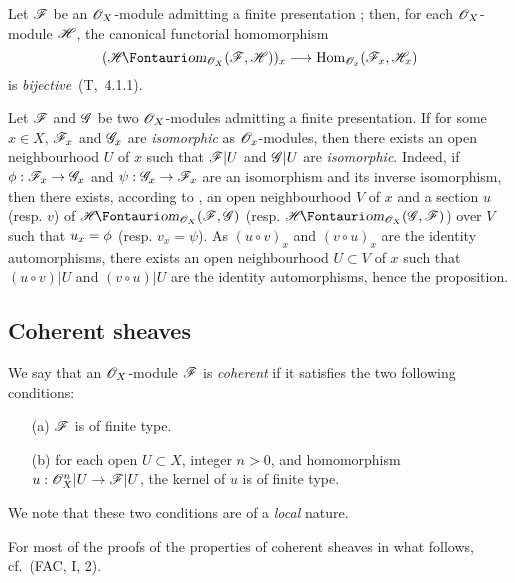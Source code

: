 \begin{env}[5.2.6]
\label{0.5.2.6}
Let $\mathscr{F}$ be an $\mathscr{O}_X$-module admitting a finite presentation ;
then, for each $\mathscr{O}_X$-module $\mathscr{H}$, the canonical functorial homomorphism
\[
  (\shHom_{\sh{O}_X}(\sh{F},\sh{H}))_x\to\Hom_{\sh{O}_x}(\sh{F}_x,\sh{H}_x)
\]
is \emph{bijective}~(T,~4.1.1).
\end{env}

\begin{env}[5.2.7]
\label{0.5.2.7}
Let $\mathscr{F}$ and $\mathscr{G}$ be two $\mathscr{O}_X$-modules admitting a finite presentation.
If for some $x\in X$, $\mathscr{F}_x$ and $\mathscr{G}_x$ are \emph{isomorphic} as $\mathscr{O}_x$-modules, then there exists an open neighbourhood $U$ of $x$ such that $\mathscr{F}|U$ and $\mathscr{G}|U$ are \emph{isomorphic}.
Indeed, if $\vphi:\sh{F}_x\to\sh{G}_x$ and $\psi:\sh{G}_x\to\sh{F}_x$ are an isomorphism and its inverse isomorphism, then there exists, according to , an open neighbourhood $V$ of $x$ and a section $u$ (resp. $v$) of $\shHom_{\sh{O}_X}(\sh{F},\sh{G})$ (resp. $\shHom_{\sh{O}_X}(\sh{G},\sh{F})$) over $V$ such
that $u_x=\phi$ (resp. $v_x=\psi$).
As $(u\circ v)_x$ and $(v\circ u)_x$ are the identity automorphisms, there exists an open neighbourhood $U\subset V$ of $x$ such that $(u\circ v)|U$ and $(v\circ u)|U$ are the identity automorphisms, hence the proposition.
\end{env}

\subsection{Coherent sheaves}
\label{subsection:0.5.3}

\begin{env}[5.3.1]
\label{0.5.3.1}
We say that an $\mathscr{O}_X$-module $\mathscr{F}$ is \emph{coherent} if it satisfies the two following conditions:
\begin{enumerate}
  \item[(a)] $\mathscr{F}$ is of finite type.
  \item[(b)] for each open $U\subset X$, integer $n>0$, and homomorphism $u:\sh{O}_X^n|U\to\sh{F}|U$, the kernel of $u$ is of finite type.
\end{enumerate}
We note that these two conditions are of a \emph{local} nature.

For most of the proofs of the properties of coherent sheaves in what follows, cf.~(FAC, I, 2).
\end{env}


